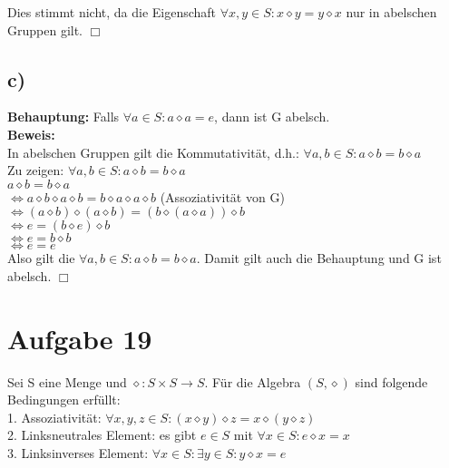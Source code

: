 \documentclass[paper = a4, ngerman]{scrartcl}
\begin{document}
	Dies stimmt nicht, da die Eigenschaft $\forall x, y \in S: x \diamond y = y \diamond x$ nur in abelschen Gruppen gilt.
	\hfill$\Box$\\
		
	\subsection*{c)}
	\textbf{Behauptung:} Falls $\forall a \in S: a \diamond a = e $, dann ist G abelsch.\\
	
	\textbf{Beweis:}\\
	In abelschen Gruppen gilt die Kommutativität, d.h.: $\forall a, b \in S: a \diamond b = b \diamond a$\\
	
	Zu zeigen: $\forall a, b \in S: a \diamond b = b \diamond a$\\
	
	$a \diamond b = b \diamond a$\\
	$\Leftrightarrow a \diamond b \diamond a \diamond b = b \diamond a\diamond a \diamond b$ \hspace{10mm}(Assoziativität von G)\\
	$\Leftrightarrow (a \diamond b) \diamond (a \diamond b) = (b \diamond (a\diamond a)) \diamond b$  \\
	$\Leftrightarrow e = (b \diamond e) \diamond b$  \\
	$\Leftrightarrow e = b \diamond b$  \\
	$\Leftrightarrow e = e$\\
	
	Also gilt die $\forall a, b \in S: a \diamond b = b \diamond a$. Damit gilt auch die Behauptung und G ist abelsch.
		\hfill$\Box$\\
	
\section*{Aufgabe 19}
Sei S eine Menge und $\diamond: S \times S \to S$. Für die Algebra $(S, \diamond)$ sind folgende Bedingungen erfüllt:\\

1. Assoziativität: $\forall x, y,z \in S: (x \diamond y) \diamond z = x \diamond (y \diamond z)$\\
2. Linksneutrales Element: es gibt $e \in S$ mit $\forall x \in S: e \diamond x = x$\\
3. Linksinverses Element: $\forall x \in S: \exists y \in S: y\diamond x = e$\\
\end{document}
